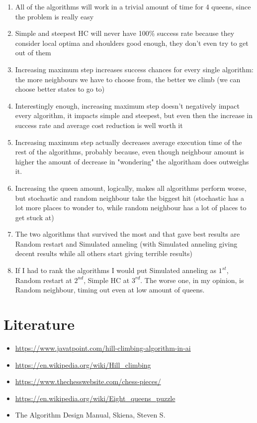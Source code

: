 \documentclass[10pt,a4paper]{article}
\begin{document}
		\begin{enumerate}
			\item All of the algorithms will work in a trivial amount of time for 4 queens, since the problem is really easy
			\item Simple and steepest HC will never have 100\% success rate because they consider local optima and shoulders good enough, they don't even try to get out of them
			\item Increasing maximum step increases success chances for every single algorithm: the more neighbours we have to choose from, the better we climb (we can choose better states to go to)
			\item Interestingly enough, increasing maximum step doesn't negatively impact every algorithm, it impacts simple and steepest, but even then the increase in success rate and average cost reduction is well worth it
			\item Increasing maximum step actually decreases average execution time of the rest of the algorithms, probably because, even though neighbour amount is higher the amount of decrease in "wondering" the algoritham does outweighs it.
			\item Increasing the queen amount, logically, makes all algorithms perform worse, but stochastic and random neighbour take the biggest hit (stochastic has a lot more places to wonder to, while random neighbour has a lot of places to get stuck at)
			\item The two algorithms that survived the most and that gave  best results are Random restart and Simulated anneling (with Simulated anneling giving decent results while all others start giving terrible results)
			\item If I had to rank the algorithms I would put Simulated anneling as $1^{st}$, Random restart at $2^{nd}$, Simple HC at $3^{rd}$. The worse one, in my opinion, is Random neighbour, timing out even at low amount of queens. 
		\end{enumerate}
	\clearpage
	\section{Literature}
	\begin{itemize}
		\item \url{https://www.javatpoint.com/hill-climbing-algorithm-in-ai}
		\item \url{https://en.wikipedia.org/wiki/Hill\_climbing}
		\item \url{https://www.thechesswebsite.com/chess-pieces/}
		\item \url{https://en.wikipedia.org/wiki/Eight\_queens\_puzzle}
		\item The Algorithm Design Manual, Skiena, Steven S.
	\end{itemize}
\end{document}
